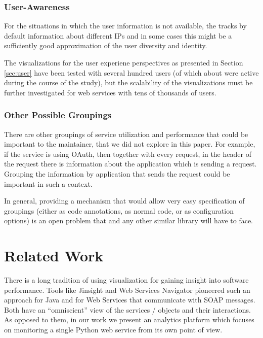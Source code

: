 \documentclass{sig-alternate-05-2015}
\begin{document}
  \subsubsection{User-Awareness }

    For the situations in which the user information is not available, the \tool tracks by default information about different IPs and in some cases this might be a sufficiently good approximation of the user diversity and identity. 

    The visualizations for the user experiene perspectives as presented in Section \ref{sec:user} have been tested with several hundred users (of which about \activeUserCount were active during the course of the study), but the scalability of the visualizations must be further investigated for web services with tens of thousands of users.


  \subsubsection{Other Possible Groupings}

    There are other groupings of service utilization and performance that could be important to the maintainer, that we did not explore in this paper. For example, if the service is using OAuth, then together with every request, in the header of the request there is information about the application which is sending a request. Grouping the information by application that sends the request could be important in such a context. 

    In general, providing a mechanism that would allow very easy specification of groupings (either as code annotations, as normal code, or as configuration options) is an open problem that \tool and any other similar library will have to face.



\section{Related Work}
\label{sec:related}


There is a long tradition of using visualization for gaining insight into software performance. Tools like Jinsight \cite{Pauw02a} and Web Services Navigator \cite{Pauw05} pioneered such an approach for Java and for Web Services that communicate with SOAP messages. Both have an ``omniscient'' view of the services / objects and their interactions. As opposed to them, in our work we present an analytics platform which focuses on monitoring a single Python web service from its own point of view.
\end{document}
